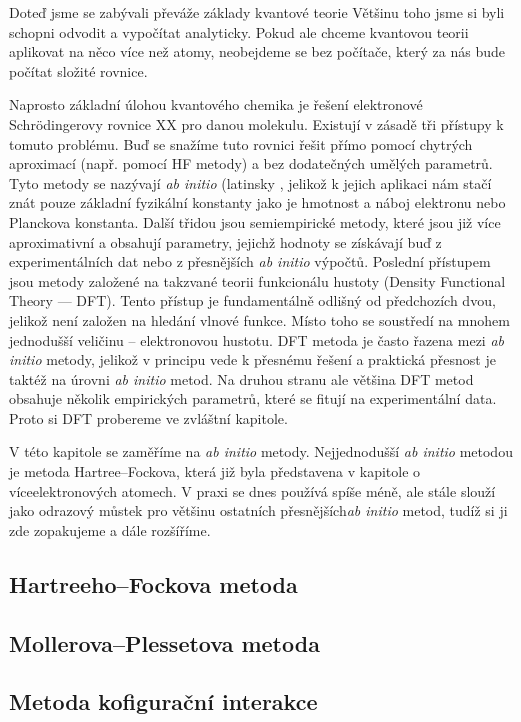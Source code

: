 Doteď jsme se zabývali převáže základy kvantové teorie 
Většinu toho jsme si byli schopni odvodit a vypočítat analyticky. 
Pokud ale chceme kvantovou teorii aplikovat na něco více než atomy,
neobejdeme se bez počítače, který za nás bude počítat složité rovnice.

Naprosto základní úlohou kvantového chemika je řešení elektronové Schr\"{o}dingerovy rovnice XX pro danou molekulu. Existují v zásadě tři přístupy k tomuto problému. Buď se snažíme tuto rovnici řešit přímo pomocí chytrých aproximací (např. pomocí HF metody) a bez dodatečných umělých parametrů. Tyto metody se nazývají \textit{ab initio} (latinsky , jelikož k jejich aplikaci nám stačí znát pouze základní fyzikální konstanty jako je hmotnost a náboj elektronu nebo Planckova konstanta. Další třidou jsou semiempirické metody, které jsou již více aproximativní a obsahují parametry, jejichž hodnoty se získávají buď z experimentálních dat nebo z přesnějších \textit{ab initio} výpočtů. Poslední přístupem jsou metody založené na takzvané teorii funkcionálu hustoty (Density Functional Theory --- DFT). Tento přístup je fundamentálně odlišný od předchozích dvou, jelikož není založen na hledání vlnové funkce. Místo toho se soustředí na mnohem jednodušší veličinu -- elektronovou hustotu. DFT metoda je často řazena mezi \textit{ab initio} metody, jelikož v principu vede k přesnému řešení a praktická přesnost je taktéž na úrovni \textit{ab initio} metod. Na druhou stranu ale většina DFT metod obsahuje několik empirických parametrů, které se fitují na experimentální data. Proto si DFT probereme ve zvláštní kapitole.  

V této kapitole se zaměříme na \textit{ab initio} metody.
Nejjednodušší \textit{ab initio} metodou je metoda Hartree--Fockova, která již byla představena v kapitole o víceelektronových atomech. V praxi se dnes používá spíše méně, ale stále slouží jako odrazový můstek pro většinu ostatních přesnějších\textit{ab initio} metod, tudíž si ji zde zopakujeme a dále rozšíříme.

\subsection{Hartreeho--Fockova metoda}

\subsection{Mollerova--Plessetova metoda}


\subsection{Metoda kofigurační interakce}

